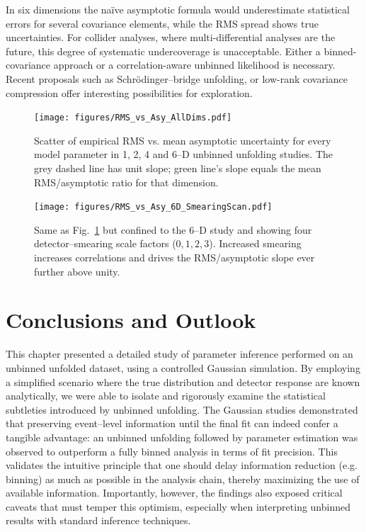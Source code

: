             In six dimensions the naïve asymptotic formula would underestimate statistical errors for several covariance elements, while the RMS spread shows true uncertainties.
            For collider analyses, where multi-differential analyses are the future, this degree of systematic undercoverage is unacceptable.
            Either a binned-covariance approach  or a correlation-aware unbinned likelihood is necessary.
            Recent proposals such as Schrödinger--bridge unfolding, or low-rank covariance compression offer interesting possibilities for exploration.
            \begin{figure}
                \centering
                \texttt{[image: figures/RMS\_vs\_Asy\_AllDims.pdf]}
                \caption{Scatter of empirical RMS vs. mean asymptotic uncertainty for every model parameter in 1, 2, 4 and 6--D unbinned unfolding studies.
                The grey dashed line has unit slope; green line's slope equals the mean RMS/asymptotic ratio for that dimension.
                }
                \label{fig:rms-asy-dim}
            \end{figure}

            \begin{figure}[htbp]
                    \centering
                  \texttt{[image: figures/RMS\_vs\_Asy\_6D\_SmearingScan.pdf]}
                  \caption{Same as Fig.~\ref{fig:rms-asy-dim} but confined to the 6--D
                  study and showing four detector–smearing scale factors
                  ($0,1,2,3$).
                  Increased smearing increases correlations and drives the
                  RMS/asymptotic slope ever further above unity.
                  }
                  \label{fig:rms-asy-6D-res}
            \end{figure}
\section{Conclusions and Outlook}
    This chapter presented a detailed study of parameter inference performed on an unbinned unfolded dataset, using a controlled Gaussian simulation.
    By employing a simplified scenario where the true distribution and detector response are known analytically, we were able to isolate and rigorously examine the statistical subtleties introduced by unbinned unfolding.
    The Gaussian studies demonstrated that preserving event--level information until the final fit can indeed confer a tangible advantage: an unbinned unfolding followed by parameter estimation was observed to outperform a fully binned analysis in terms of fit precision.
    This validates the intuitive principle that one should delay information reduction (e.g. binning) as much as possible in the analysis chain, thereby maximizing the use of available information.
    Importantly, however, the findings also exposed critical caveats that must temper this optimism, especially when interpreting unbinned results with standard inference techniques.

